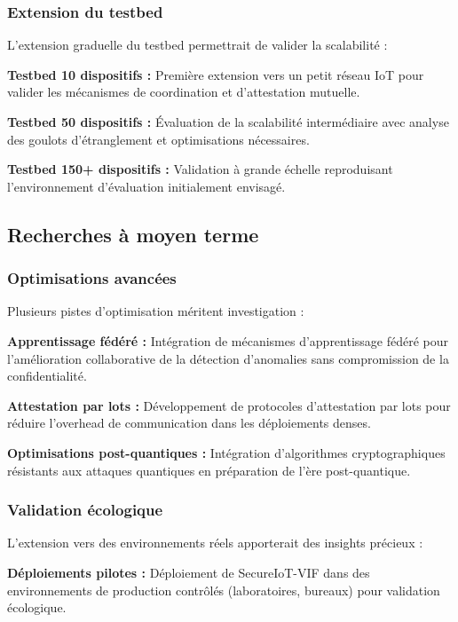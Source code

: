 \subsubsection{Extension du testbed}

L'extension graduelle du testbed permettrait de valider la scalabilité :

\textbf{Testbed 10 dispositifs :} Première extension vers un petit réseau IoT pour valider les mécanismes de coordination et d'attestation mutuelle.

\textbf{Testbed 50 dispositifs :} Évaluation de la scalabilité intermédiaire avec analyse des goulots d'étranglement et optimisations nécessaires.

\textbf{Testbed 150+ dispositifs :} Validation à grande échelle reproduisant l'environnement d'évaluation initialement envisagé.

\subsection{Recherches à moyen terme}

\subsubsection{Optimisations avancées}

Plusieurs pistes d'optimisation méritent investigation :

\textbf{Apprentissage fédéré :} Intégration de mécanismes d'apprentissage fédéré pour l'amélioration collaborative de la détection d'anomalies sans compromission de la confidentialité.

\textbf{Attestation par lots :} Développement de protocoles d'attestation par lots pour réduire l'overhead de communication dans les déploiements denses.

\textbf{Optimisations post-quantiques :} Intégration d'algorithmes cryptographiques résistants aux attaques quantiques en préparation de l'ère post-quantique.

\subsubsection{Validation écologique}

L'extension vers des environnements réels apporterait des insights précieux :

\textbf{Déploiements pilotes :} Déploiement de SecureIoT-VIF dans des environnements de production contrôlés (laboratoires, bureaux) pour validation écologique.

